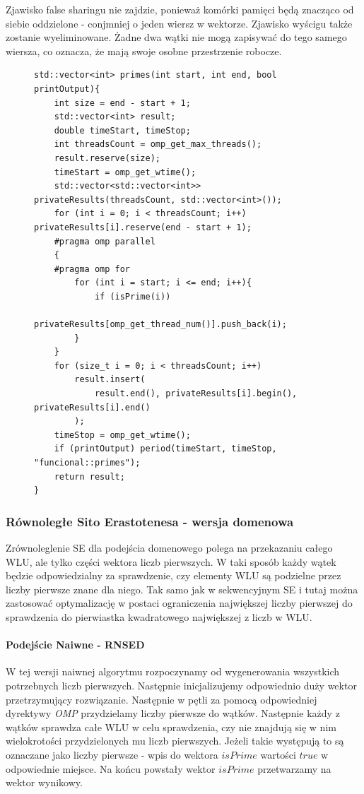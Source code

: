 \documentclass{article}
\begin{document}
                    Zjawisko false sharingu nie zajdzie, ponieważ komórki pamięci będą znacząco od siebie oddzielone - conjmniej o jeden wiersz w wektorze. Zjawisko wyścigu także zostanie wyeliminowane. Żadne dwa wątki nie mogą zapisywać do tego samego wiersza, co oznacza, że mają swoje osobne przestrzenie robocze.
                \begin{figure}[H]
                    \begin{verbatim}
std::vector<int> primes(int start, int end, bool printOutput){
    int size = end - start + 1;
    std::vector<int> result;
    double timeStart, timeStop;
    int threadsCount = omp_get_max_threads();
    result.reserve(size);
    timeStart = omp_get_wtime();
    std::vector<std::vector<int>> privateResults(threadsCount, std::vector<int>());
    for (int i = 0; i < threadsCount; i++) privateResults[i].reserve(end - start + 1);
    #pragma omp parallel
    {
    #pragma omp for
        for (int i = start; i <= end; i++){
            if (isPrime(i))
                privateResults[omp_get_thread_num()].push_back(i);
        }
    }
    for (size_t i = 0; i < threadsCount; i++)
        result.insert(
            result.end(), privateResults[i].begin(), privateResults[i].end()
        );
    timeStop = omp_get_wtime();
    if (printOutput) period(timeStart, timeStop, "funcional::primes");
    return result;
}
                    \end{verbatim}
                \end{figure}
                
                
            \subsubsection{Równoległe Sito Erastotenesa - wersja domenowa}
                Zrównoleglenie \gls{SE} dla podejścia domenowego polega na przekazaniu całego \gls{WLU}, ale tylko części wektora liczb pierwszych. W taki sposób każdy wątek będzie odpowiedzialny za sprawdzenie, czy elementy \gls{WLU} są podzielne przez liczby pierwsze znane dla niego. Tak samo jak w sekwencyjnym \gls{SE} i tutaj można zastosować optymalizację w postaci ograniczenia największej liczby pierwszej do sprawdzenia do pierwiastka kwadratowego największej z liczb w \gls{WLU}.
                
                \paragraph{Podejście Naiwne - \gls{RNSED}}
                    W tej wersji naiwnej algorytmu rozpoczynamy od wygenerowania wszystkich potrzebnych liczb pierwszych. Następnie inicjalizujemy odpowiednio duży wektor przetrzymujący rozwiązanie. Następnie w pętli za pomocą odpowiedniej dyrektywy \emph{OMP} przydzielamy liczby pierwsze do wątków. Następnie każdy z wątków sprawdza całe \gls{WLU} w celu sprawdzenia, czy nie znajdują się w nim wielokrotości przydzielonych mu liczb pierwszych. Jeżeli takie występują to są oznaczane jako liczby pierwsze - wpis do wektora $isPrime$ wartości $true$ w odpowiednie miejsce. Na końcu powstały wektor $isPrime$ przetwarzamy na wektor wynikowy.
                    
\end{document}
